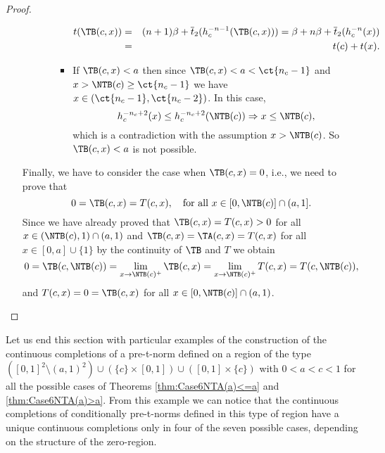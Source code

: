 \begin{proof}
\begin{enumerate}[label=(\roman*)]
\begin{itemize}
\begin{itemize}
\begin{itemize}
					\begin{eqnarray*}
					t(\TB(c,x)) & = & (n+1)\beta+\overline{t}_2(h_c^{-n-1}(\TB(c,x))) = \beta + n\beta + \overline{t}_2(h_c^{-n}(x)) \\
					& = & t(c)+t(x).
					\end{eqnarray*}
					\item If $\TB(c,x) < a$  then since $\TB(c,x) < a < \ct{n_c-1}$ and $x > \NTB(c) \geq \ct{n_c-1}$  we have $x \in (\ct{n_c-1},\ct{n_c-2})$. In this case,
					$$h_c^{-n_c+2}(x) \leq h_c^{-n_c+2}(\NTB(c)) \Rightarrow x \leq \NTB(c),$$
					which is a contradiction with the assumption $x > \NTB(c)$.  So $\TB(c,x)<a$ is not possible.
				\end{itemize}
			\end{itemize}
		\end{itemize}
		Finally, we have to consider the case when $\TB(c,x)=0$, i.e., we need to prove that
		$$0=\TB(c,x)=T(c,x), \quad \text{for all } x \in [0,\NTB(c)] \cap (a,1].$$
		Since we have already proved that $\TB(c,x)=T(c,x)>0$ for all $x \in (\NTB(c),1) \cap (a,1)$ and $\TB(c,x)=\TA(c,x)=T(c,x)$ for all $x \in [0,a] \cup \{1\}$ by the continuity of $\TB$ and $T$ we obtain
		$$0 = \TB(c,\NTB(c)) = \lim_{x \to \NTB(c)^{+}} \TB(c,x) = \lim_{x \to \NTB(c)^{+}} T(c,x) = T(c,\NTB(c)),$$
		and $T(c,x)=0=\TB(c,x)$ for all $x \in [0,\NTB(c)] \cap (a,1)$.
	\end{enumerate}
\label{last-page-long-proof}
\end{proof}

Let us end this section with particular examples of the construction of the continuous completions of a pre-t-norm defined on a region of the type $([0,1]^2 \setminus (a,1)^2) \cup (\{c\} \times [0,1]) \cup ([0,1] \times \{c\})$ with $0<a<c<1$ for all the possible cases of Theorems \ref{thm:Case6NTA(a)<=a} and \ref{thm:Case6NTA(a)>a}. From this example we can notice that the continuous completions of conditionally pre-t-norms defined in this type of region have a unique continuous completions only in four of the seven possible cases, depending on the structure of the zero-region.

